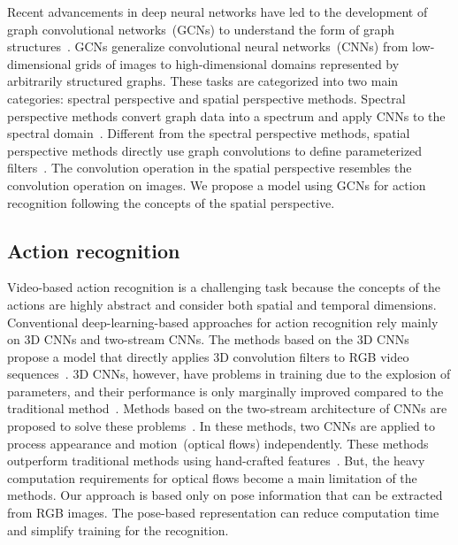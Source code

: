 \documentclass[10pt,twocolumn,letterpaper]{article}
\begin{document}
Recent advancements in deep neural networks have led to the development of graph convolutional networks~(GCNs) to understand the form of graph structures~\cite{bruna2013spectral,defferrard2016convolutional,duvenaud2015convolutional, kipf2016semi, li2015gated,niepert2016learning}. 
GCNs generalize convolutional neural networks~(CNNs) from low-dimensional grids of images to high-dimensional domains represented by arbitrarily structured graphs.
These tasks are categorized into two main categories: spectral perspective and spatial perspective methods. 
Spectral perspective methods convert graph data into a spectrum and apply CNNs to the spectral domain~\cite{defferrard2016convolutional,duvenaud2015convolutional, li2015gated}.
Different from the spectral perspective methods, spatial perspective methods directly use graph convolutions to define parameterized filters~\cite{bruna2013spectral,niepert2016learning}.
The convolution operation in the spatial perspective resembles the convolution operation on images.
We propose a model using GCNs for action recognition following the concepts of the spatial perspective.

\subsection{Action recognition}
Video-based action recognition is a challenging task because the concepts of the actions are highly abstract and consider both spatial and temporal dimensions.
Conventional deep-learning-based approaches for action recognition rely mainly on 3D CNNs and two-stream CNNs.
The methods based on the 3D CNNs propose a model that directly applies 3D convolution filters to RGB video sequences~\cite{carreira2017quo,ji20133d, tran2015learning}.
3D CNNs, however, have problems in training due to the explosion of parameters, and their performance is only marginally improved compared to the traditional method~\cite{wang2013action}.
Methods based on the two-stream architecture of CNNs are proposed to solve these problems~\cite{feichtenhofer2016convolutional,simonyan2014two, wang2016temporal}.
In these methods, two CNNs are applied to process appearance and motion~(optical flows) independently.
These methods outperform traditional methods using hand-crafted features~\cite{dalal2005histograms, laptev2008learning, wang2013action}.
But, the heavy computation requirements for optical flows become a main limitation of the methods.
Our approach is based only on pose information that can be extracted from RGB images. 
The pose-based representation can reduce computation time and simplify training for the recognition.
\end{document}
